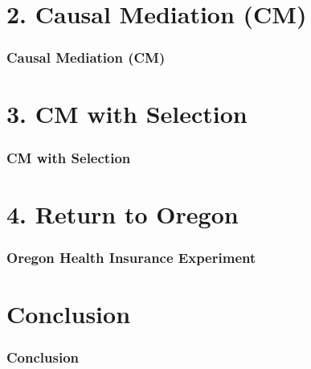 \documentclass[dvipsnames,handout]{beamer} %
\begin{document}
\section{2. Causal Mediation (CM)}
\begin{frame}
    \frametitle{Causal Mediation (CM)}
\end{frame}
\section{3. CM with Selection}
\begin{frame}
    \frametitle{CM with Selection}
\end{frame}
\section{4. Return to Oregon}
\begin{frame}
    \frametitle{Oregon Health Insurance Experiment}
\end{frame}
\section{Conclusion}
\begin{frame}
    \frametitle{Conclusion}
\end{frame}
\end{document}
